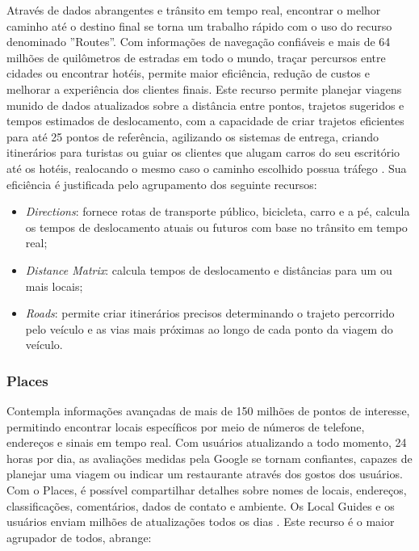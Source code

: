 Através de dados abrangentes e trânsito em tempo real, encontrar o melhor caminho até o destino final se torna um trabalho rápido com o uso do recurso denominado ''Routes''. Com informações de navegação confiáveis e mais de 64 milhões de quilômetros de estradas em todo o mundo, traçar percursos entre cidades ou encontrar hotéis, permite maior eficiência, redução de custos e melhorar a experiência dos clientes finais. Este recurso permite planejar viagens munido de dados atualizados sobre a distância entre pontos, trajetos sugeridos e tempos estimados de deslocamento, com a capacidade de criar trajetos eficientes para até 25 pontos de referência, agilizando os sistemas de entrega, criando itinerários para turistas ou guiar os clientes que alugam carros do seu escritório até os hotéis, realocando o mesmo caso o caminho escolhido possua tráfego \cite{google:2019}. Sua eficiência é justificada pelo agrupamento dos seguinte recursos:

\begin{itemize}
    \item \textit{Directions}: fornece rotas de transporte público, bicicleta, carro e a pé, calcula os tempos de deslocamento atuais ou futuros com base no trânsito em tempo real;
    \item \textit{Distance Matrix}: calcula tempos de deslocamento e distâncias para um ou mais locais;
    \item \textit{Roads}: permite criar itinerários precisos determinando o trajeto percorrido pelo veículo e as vias mais próximas ao longo de cada ponto da viagem do veículo.
\end{itemize}

\subsubsection{Places}

Contempla informações avançadas de mais de 150 milhões de pontos de interesse, permitindo encontrar locais específicos por meio de números de telefone, endereços e sinais em tempo real. Com usuários atualizando a todo momento, 24 horas por dia, as avaliações medidas pela Google se tornam confiantes, capazes de planejar uma viagem ou indicar um restaurante através dos gostos dos usuários. Com o Places, é possível compartilhar detalhes sobre nomes de locais, endereços, classificações, comentários, dados de contato e ambiente. Os Local Guides e os usuários enviam milhões de atualizações todos os dias \cite{google:2019}. Este recurso é o maior agrupador de todos, abrange:

